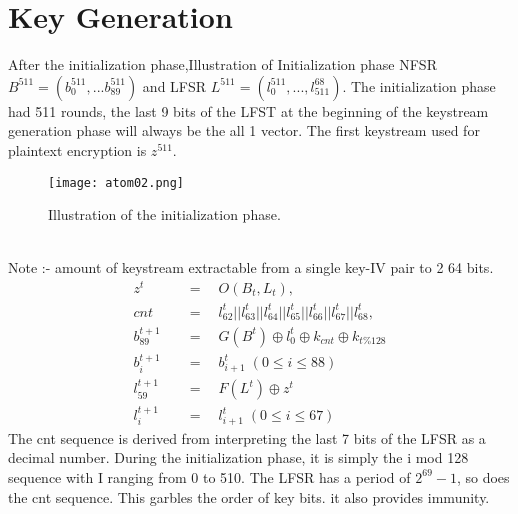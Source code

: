 \section{Key Generation}
After the initialization phase,Illustration of Initialization phase
NFSR$ B^{511} = (b^{511}_0 , . . . b^{511}_{89} )$ and LFSR
$L^{511} = (l^{511}_0 , . . . ,l_{511}^{68} )$. The initialization
phase had 511 rounds, the last 9 bits of
the LFST at the beginning of the
keystream generation phase will
always be the all 1 vector. The first
keystream used for plaintext
encryption is $z^{511}$.\\[2mm]
\begin{figure}[h]
	\centering
	
	\texttt{[image: atom02.png]}
	\caption{Illustration of the initialization phase.}
	\label{fig:atom02}
\end{figure}
\\[2mm]
Note :- amount of keystream
extractable from a single key-IV pair to
2 64 bits.
\begin{align*}
z^t \quad &= \quad O(B_t,L_t),\\ 
cnt \quad &= \quad l^t_{62}||l^t_{63}||l^t_{64}||l^t_{65}||l^t_{66}||l^t_{67}||l^t_{68}, \\ 
b^{t+1}_{89} \quad &= \quad G(B^t)\oplus l^t_{0} \oplus k_{cnt} \oplus k_{t\%128}  \\ 
b^{t+1}_{i} \quad &= \quad b^{t}_{i+1} \; (0 \leq i \leq 88)\\ 
l^{t+1}_{59} \quad &= \quad F(L^t) \oplus z^t\\
l^{t+1}_{i} \quad &= \quad l^{t}_{i+1} \; (0 \leq i \leq 67)
\end{align*}
The cnt sequence is derived from interpreting the last 7 bits of the LFSR as a decimal number. During the initialization phase, it is simply the i
mod 128 sequence with I ranging from 0 to 510. The LFSR has a period of $2^{69} -1$, so does the cnt sequence. This garbles the order of key bits. it also provides
immunity.

%	
